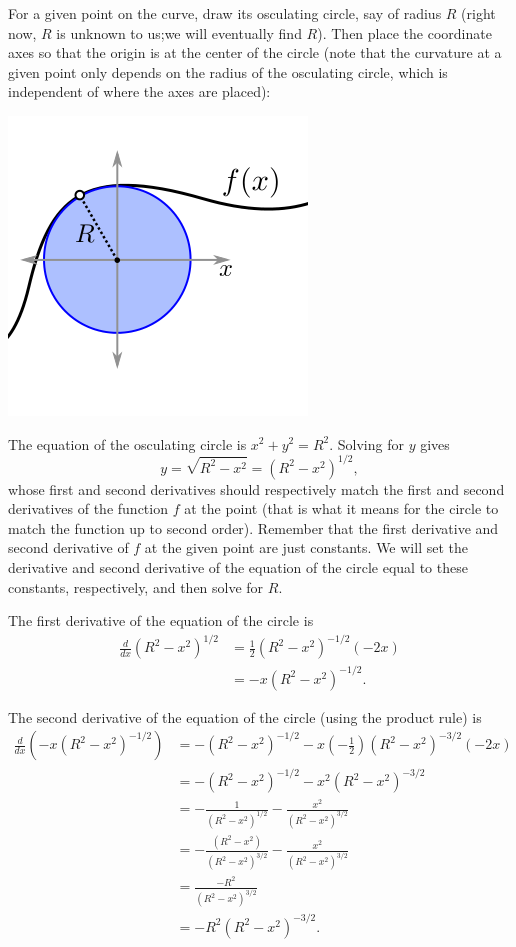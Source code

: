 \documentclass[twoside,openright,titlepage,a4paper]{book}
\begin{document}
\begin{sloppypar}
\begin{examplebox}
For a given point on the curve, draw its osculating circle, say of radius $R$ (right now, $R$ is unknown to us;we will eventually find $R$). Then place the coordinate axes so that the origin is at the center of the circle (note that the curvature at a given point only depends on the radius of the osculating circle, which is independent of where the axes are placed):
\begin{center}\includegraphics[scale=0.6]{Osculating}\end{center}
The equation of the osculating circle is $x^2+y^2 = R^2$. Solving for $y$ gives \[ y = \sqrt{R^2-x^2} = (R^2-x^2)^{1/2}, \] whose first and second derivatives should respectively match the first and second derivatives of the function $f$ at the point (that is what it means for the circle to match the function up to second order). Remember that the first derivative and second derivative of $f$ at the given point are just constants. We will set the derivative and second derivative of the equation of the circle equal to these constants, respectively, and then solve for $R$.

The first derivative of the equation of the circle is 
\begin{align*}
\frac{d}{dx} (R^2-x^2)^{1/2} &= \frac{1}{2}(R^2-x^2)^{-1/2}(-2x) \\
&= -x(R^2-x^2)^{-1/2}. 
\end{align*}

The second derivative of the equation of the circle (using the product rule) is
\begin{align*}
\frac{d}{dx} \left(-x(R^2-x^2)^{-1/2} \right) &= -(R^2-x^2)^{-1/2} - x \left(-\frac{1}{2}\right)(R^2-x^2)^{-3/2}(-2x) \\
&= -(R^2-x^2)^{-1/2} - x^2 (R^2-x^2)^{-3/2} \\
&= - \frac{1}{(R^2-x^2)^{1/2}} - \frac{x^2}{(R^2-x^2)^{3/2}} \\
&= - \frac{\left(R^2-x^2\right)}{(R^2-x^2)^{3/2}} - \frac{x^2}{(R^2-x^2)^{3/2}} \\
&= \frac{-R^2}{(R^2-x^2)^{3/2}} \\
&= -R^2 (R^2-x^2)^{-3/2}.
\end{align*}


\end{examplebox}
\end{sloppypar}
\end{document}
